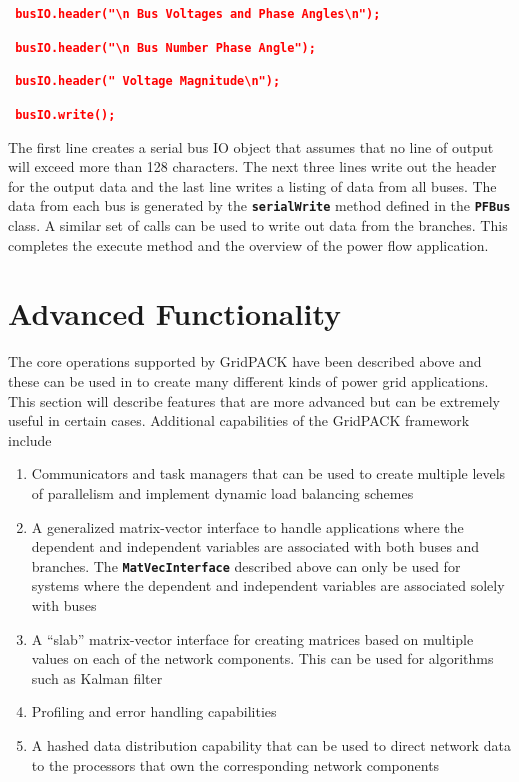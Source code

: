 \documentclass[12pt]{report} %
\begin{document}
\textcolor{red}{\texttt{\textbf{  busIO.header("{\textbackslash}n   Bus Voltages and Phase Angles{\textbackslash}n");}}}

\textcolor{red}{\texttt{\textbf{  busIO.header("{\textbackslash}n   Bus Number      Phase Angle");}}}

\textcolor{red}{\texttt{\textbf{  busIO.header("      Voltage Magnitude{\textbackslash}n");}}}

\textcolor{red}{\texttt{\textbf{  busIO.write();}}}

The first line creates a serial bus IO object that assumes that no line of output will exceed more than 128 characters. The next three lines write out the header for the output data and the last line writes a listing of data from all buses. The data from each bus is generated by the \texttt{\textbf{serialWrite}} method defined in the \texttt{\textbf{PFBus}} class. A similar set of calls can be used to write out data from the branches. This completes the execute method and the overview of the power flow application.

\chapter{Advanced Functionality}

The core operations supported by GridPACK have been described above and these can be used in to create many different kinds of power grid applications. This section will describe features that are more advanced but can be extremely useful in certain cases. Additional capabilities of the GridPACK framework include
\begin{enumerate}
\item  Communicators and task managers that can be used to create multiple levels of parallelism and implement dynamic load balancing schemes

\item  A generalized matrix-vector interface to handle applications where the dependent and independent variables are associated with both buses and branches. The \texttt{\textbf{MatVecInterface}} described above can only be used for systems where the dependent and independent variables are associated solely with buses

\item  A ``slab'' matrix-vector interface for creating matrices based on multiple values on each of the network components. This can be used for algorithms such as Kalman filter

\item  Profiling and error handling capabilities

\item  A hashed data distribution capability that can be used to direct network data to the processors that own the corresponding network components
\end{enumerate}
\end{document}
